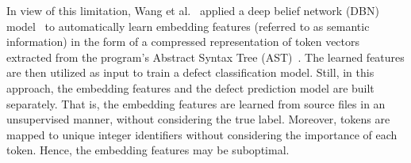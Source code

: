 
In view of this limitation, Wang et al.~\cite{wang2016automatically} applied a deep belief network (DBN) model~\cite{hinton2009deep} to automatically learn embedding features (referred to as semantic information) in the form of a compressed representation of token vectors extracted from the program's Abstract Syntax Tree (AST)~\cite{Hindle:2012:NS:2337223.2337322}. The learned features are then utilized as input to train a defect classification model. Still, in this approach, the embedding features and the defect prediction model are built separately.
That is, the embedding features are learned from source files in an unsupervised manner, without considering the true label. Moreover, tokens are mapped to unique integer identifiers without considering the importance of each token. Hence, the embedding features may be suboptimal. 

